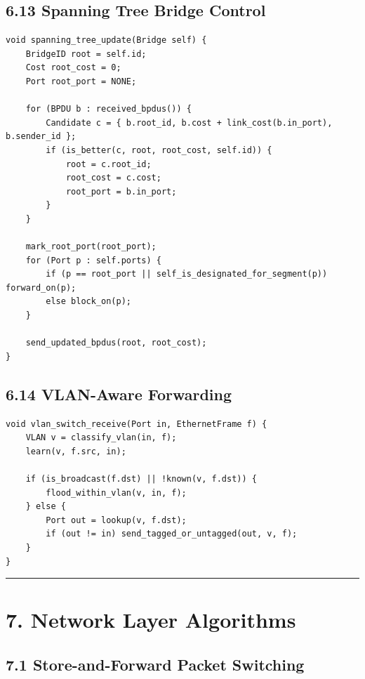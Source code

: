\documentclass[11pt]{article}
\begin{document}
\subsection{6.13 Spanning Tree Bridge
Control}\label{spanning-tree-bridge-control}

\begin{verbatim}
void spanning_tree_update(Bridge self) {
    BridgeID root = self.id;
    Cost root_cost = 0;
    Port root_port = NONE;

    for (BPDU b : received_bpdus()) {
        Candidate c = { b.root_id, b.cost + link_cost(b.in_port), b.sender_id };
        if (is_better(c, root, root_cost, self.id)) {
            root = c.root_id;
            root_cost = c.cost;
            root_port = b.in_port;
        }
    }

    mark_root_port(root_port);
    for (Port p : self.ports) {
        if (p == root_port || self_is_designated_for_segment(p)) forward_on(p);
        else block_on(p);
    }

    send_updated_bpdus(root, root_cost);
}
\end{verbatim}

\subsection{6.14 VLAN-Aware Forwarding}\label{vlan-aware-forwarding}

\begin{verbatim}
void vlan_switch_receive(Port in, EthernetFrame f) {
    VLAN v = classify_vlan(in, f);
    learn(v, f.src, in);

    if (is_broadcast(f.dst) || !known(v, f.dst)) {
        flood_within_vlan(v, in, f);
    } else {
        Port out = lookup(v, f.dst);
        if (out != in) send_tagged_or_untagged(out, v, f);
    }
}
\end{verbatim}

\begin{center}\rule{0.5\linewidth}{0.5pt}\end{center}

\section{7. Network Layer Algorithms}\label{network-layer-algorithms}

\subsection{7.1 Store-and-Forward Packet
Switching}\label{store-and-forward-packet-switching}
\end{document}
